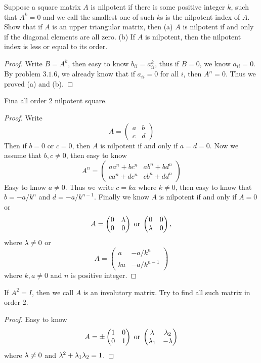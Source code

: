 \begin{pro}%
	Suppose a square matrix $A$ is nilpotent if there is some positive integer $k$, such that $A^k=0$ and we call the smallest one of such $k$s is the nilpotent index of $A$. Show that if $A$ is an upper triangular matrix, then (a) $A$ is nilpotent if and only if the diagonal elements are all zero. (b) If $A$ is nilpotent, then the nilpotent index is less or equal to its order.
\end{pro}

\begin{proof}
	Write $B=A^k$, then easy to know $b_{ii}=a_{ii}^k$, thus if $B=0$, we know $a_{ii}=0$. By problem $3.1.6$, we already know that if $a_{ii}=0$ for all $i$, then $A^n=0$. Thus we proved (a) and (b).
\end{proof}

\begin{pro}%
	Fina all order 2 nilpotent square.
\end{pro}
\begin{proof}
	Write
	\[A=\begin{pmatrix}a&b\\c&d\end{pmatrix}\]
	Then if $b=0$ or $c=0$, then $A$ is nilpotent if and only if $a=d=0$. Now we assume that $b,c\neq 0$, then easy to know
	\[A^n=\begin{pmatrix}aa^n+bc^n&ab^n+bd^n\\ca^n+dc^n&cb^n+dd^n\end{pmatrix}\]
	Easy to know $a\neq 0$. Thus we write $c=ka$ where $k\neq 0$, then easy to know that $b=-a/k^n$ and $d=-a/k^{n-1}$. Finally we know $A$ is nilpotent if and only if $A=0$ or
	\[A=\begin{pmatrix}0&\lambda\\0&0\end{pmatrix}\;\mbox{or}\;\begin{pmatrix}0&0\\\lambda&0\end{pmatrix},\]
	where $\lambda \neq 0$ or
	\[A=\begin{pmatrix} a&-a/k^n\\ka&-a/k^{n-1}\end{pmatrix}\]
	where $k,a\neq 0$ and $n$ is positive integer.
\end{proof}

\begin{pro}%
	If $A^2=I$, then we call $A$ is an involutory matrix. Try to find all such matrix in order $2$.
\end{pro}
\begin{proof}
	Easy to know 
	\[A=\pm\begin{pmatrix}1&0\\0&1\end{pmatrix}\;\mbox{or}\;\begin{pmatrix}\lambda&\lambda_2\\
	\lambda_1&-\lambda\end{pmatrix}\]
	where $\lambda\neq 0$ and $\lambda^2+\lambda_1\lambda_2=1$.
\end{proof}

